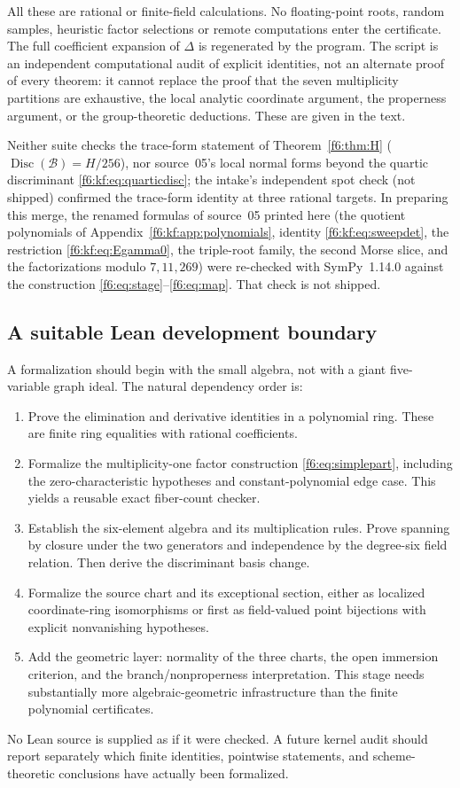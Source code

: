 \documentclass[11pt,a4paper]{article}
\theoremstyle{definition}
\newcommand{\Disc}{\operatorname{Disc}}
\begin{document}
All these are rational or finite-field calculations. No floating-point
roots, random samples, heuristic factor selections or remote computations
enter the certificate. The full coefficient expansion of $\Delta$ is
regenerated by the program. The script is an independent computational audit
of explicit identities, not an alternate proof of every theorem: it cannot
replace the proof that the seven multiplicity partitions are exhaustive, the
local analytic coordinate argument, the properness argument, or the
group-theoretic deductions. These are given in the text.

Neither suite checks the trace-form statement of Theorem~\ref{f6:thm:H}
($\Disc(\mathcal B)=H/256$), nor source~05's local normal forms beyond the
quartic discriminant \eqref{f6:kf:eq:quarticdisc}; the intake's independent
spot check (not shipped) confirmed the trace-form identity at three rational
targets. In preparing this merge,
the renamed formulas of source~05 printed here (the quotient polynomials of
Appendix~\ref{f6:kf:app:polynomials}, identity \eqref{f6:kf:eq:sweepdet},
the restriction \eqref{f6:kf:eq:Egamma0}, the triple-root family, the second
Morse slice, and the factorizations modulo $7,11,269$) were re-checked with
SymPy~1.14.0 against the construction \eqref{f6:eq:stage}--\eqref{f6:eq:map}.
That check is not shipped.

\subsection{A suitable Lean development boundary}
A formalization should begin with the small algebra, not with a giant
five-variable graph ideal. The natural dependency order is:
\begin{enumerate}[label=\textup{(\arabic*)}]
\item Prove the elimination and derivative identities in a polynomial
ring. These are finite ring equalities with rational coefficients.
\item Formalize the multiplicity-one factor construction
\eqref{f6:eq:simplepart}, including the zero-characteristic hypotheses and
constant-polynomial edge case. This yields a reusable exact fiber-count
checker.
\item Establish the six-element algebra and its multiplication rules.
Prove spanning by closure under the two generators and independence by
the degree-six field relation. Then derive the discriminant basis change.
\item Formalize the source chart and its exceptional section, either as
localized coordinate-ring isomorphisms or first as field-valued point
bijections with explicit nonvanishing hypotheses.
\item Add the geometric layer: normality of the three charts, the open
immersion criterion, and the branch/nonproperness interpretation. This
stage needs substantially more algebraic-geometric infrastructure than
the finite polynomial certificates.
\end{enumerate}
No Lean source is supplied as if it were checked. A future kernel audit
should report separately which finite identities, pointwise statements,
and scheme-theoretic conclusions have actually been formalized.
\end{document}
